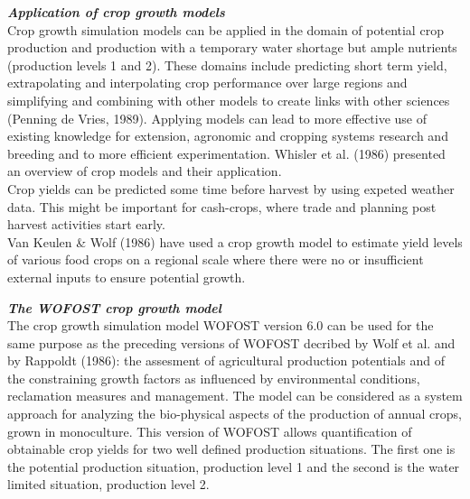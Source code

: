 \documentclass[11pt]{article}
\begin{document}
\bigskip
\bigskip
\bigskip
\bigskip
{\bf {\it Application of crop growth models\/}}\\
Crop growth simulation models can be applied in the domain of potential crop
production and production with a temporary water shortage but ample nutrients
(production levels 1 and 2). These domains include predicting short term yield,
extrapolating and interpolating crop performance over large regions and simplifying
and combining with other models to create links with other sciences (Penning de
Vries, 1989). Applying models can lead to more effective use of existing knowledge
for extension, agronomic and cropping systems research and breeding and to more
efficient experimentation. Whisler et al. (1986) presented an overview of crop models
and their application. \\
Crop yields can be predicted some time before harvest by using expeted weather
data. This might be important for cash-crops, where trade and planning post harvest
activities start early.\\
Van Keulen \& Wolf (1986) have used a crop growth model to estimate yield levels of
various food crops on a regional scale where there were no or insufficient external
inputs to ensure potential growth.

\bigskip
{\bf {\it The WOFOST crop growth model\/}}\\
The crop growth simulation model WOFOST version 6.0 can be used for the same
purpose as the preceding versions of WOFOST decribed by Wolf et al. and by
Rappoldt (1986): the assesment of agricultural production potentials and of the
constraining growth factors as influenced by environmental conditions, reclamation
measures and management. The model can be considered as a system approach for
analyzing the bio-physical aspects of the production of annual crops, grown in
monoculture. This version of WOFOST allows quantification of obtainable crop
yields for two well defined production situations. The first one is the potential
production situation, production level 1 and the second is the water limited situation,
production level 2.
\end{document}

